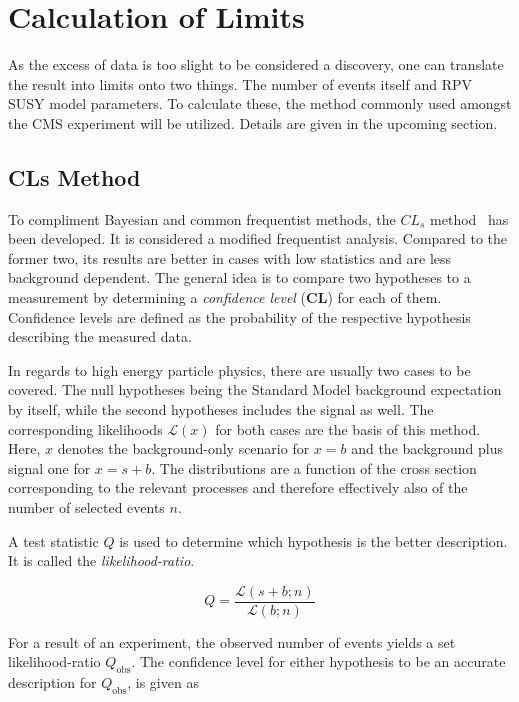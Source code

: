 \section{Calculation of Limits}
\label{sec:calc-of-limits}

As the excess of data is too slight to be considered a discovery, one can translate the result into limits onto two things. The number of events itself and RPV SUSY model parameters. To calculate these, the method commonly used amongst the CMS experiment will be utilized. Details are given in the upcoming section.


\subsection{CLs Method}
\label{sec:cls-method}

To compliment Bayesian and common frequentist methods, the $CL_s$ method~\cite{cls,cls2} has been developed. It is considered a modified frequentist analysis. Compared to the former two, its results are better in cases with low statistics and are less background dependent. The general idea is to compare two hypotheses to a measurement by determining a \textit{confidence level} (\textbf{CL}) for each of them. Confidence levels are defined as the probability of the respective hypothesis describing the measured data.

In regards to high energy particle physics, there are usually two cases to be covered. The null hypotheses being the Standard Model background expectation by itself, while the second hypotheses includes the signal as well. The corresponding likelihoods $\mathcal{L} (x)$ for both cases are the basis of this method. Here, $x$ denotes the background-only scenario for $x = b$ and the background plus signal one for $x = s + b$. The distributions are a function of the cross section corresponding to the relevant processes and therefore effectively also of the number of selected events $n$.

A test statistic $Q$ is used to determine which hypothesis is the better description. It is called the \textit{likelihood-ratio}.

\begin{equation}
  \label{eq:testq}
  Q = \frac{\mathcal{L} (s + b; n)}{\mathcal{L} (b; n)}
\end{equation}

For a result of an experiment, the observed number of events yields a set likelihood-ratio $Q_{\text{obs}}$. The confidence level for either hypothesis to be an accurate description for $Q_{\text{obs}}$, is given as

